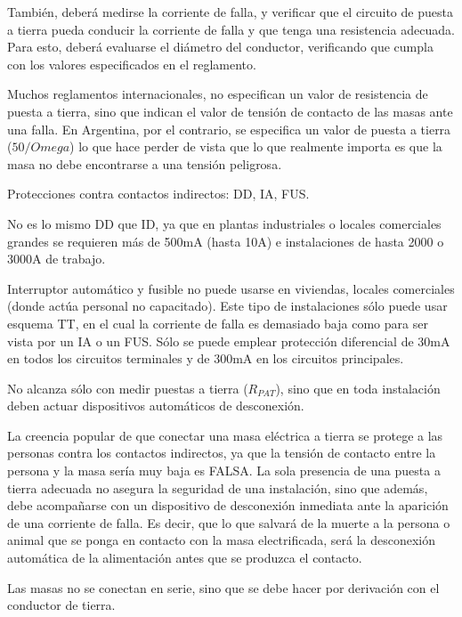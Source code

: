 También, deberá medirse la corriente de falla, y verificar que el circuito de puesta a tierra pueda conducir la corriente de falla y que tenga una resistencia adecuada. Para esto, deberá evaluarse el diámetro del conductor, verificando que cumpla con los valores especificados en el reglamento.

Muchos reglamentos internacionales, no especifican un valor de resistencia de puesta a tierra, sino que indican el valor de tensión de contacto de las masas ante una falla. En Argentina, por el contrario, se especifica un valor de puesta a tierra ($50 /Omega$) lo que hace perder de vista que lo que realmente importa es que la masa no debe encontrarse a una tensión peligrosa.



Protecciones contra contactos indirectos: DD, IA, FUS.

No es lo mismo DD que ID, ya que en plantas industriales o locales comerciales grandes se requieren más de 500mA (hasta 10A) e instalaciones de hasta 2000 o 3000A de trabajo.

Interruptor automático y fusible no puede usarse en viviendas, locales comerciales (donde actúa personal no capacitado). Este tipo de instalaciones sólo puede usar esquema TT, en el cual la corriente de falla es demasiado baja como para ser vista por un IA o un FUS. Sólo se puede emplear protección diferencial de 30mA en todos los circuitos terminales y de 300mA en los circuitos principales.

No alcanza sólo con medir puestas a tierra ($R_{PAT}$), sino que en toda instalación deben actuar dispositivos automáticos de desconexión.

La creencia popular de que conectar una masa eléctrica a tierra se protege a las personas contra los contactos indirectos, ya que la tensión de contacto entre la persona y la masa sería muy baja es FALSA. La sola presencia de una puesta a tierra adecuada no asegura la seguridad de una instalación, sino que además, debe acompañarse con un dispositivo de desconexión inmediata ante la aparición de una corriente de falla. Es decir, que lo que salvará de la muerte a la persona o animal que se ponga en contacto con la masa electrificada, será la desconexión automática de la alimentación antes que se produzca el contacto.


Las masas no se conectan en serie, sino que se debe hacer por derivación con el conductor de tierra.

